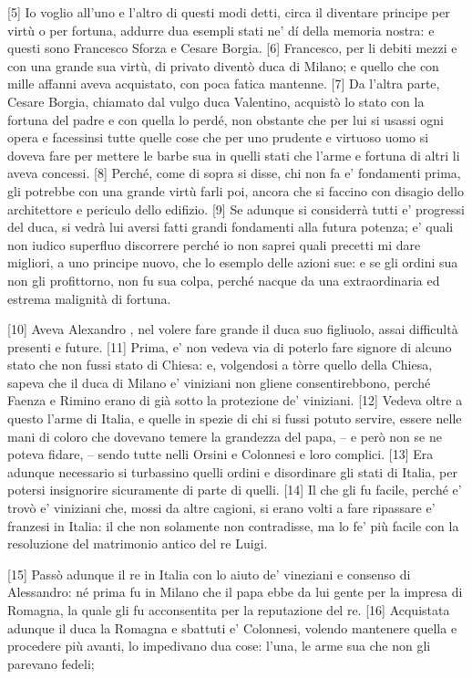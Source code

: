 {[}5{]} Io voglio all'uno e l'altro di questi modi detti, circa il
diventare principe per virtù o per fortuna, addurre dua esempli stati
ne' dí della memoria nostra: e questi sono Francesco Sforza e Cesare
Borgia. {[}6{]} Francesco, per li debiti mezzi e con una grande sua
virtù, di privato diventò duca di Milano; e quello che con mille affanni
aveva acquistato, con poca fatica mantenne. {[}7{]} Da l'altra parte,
Cesare Borgia, chiamato dal vulgo duca Valentino, acquistò lo stato con
la fortuna del padre e con quella lo perdé, non obstante che per lui si
usassi ogni opera e facessinsi tutte quelle cose che per uno prudente e
virtuoso uomo si doveva fare per mettere le barbe sua in quelli stati
che l'arme e fortuna di altri li aveva concessi. {[}8{]} Perché, come di
sopra si disse, chi non fa e' fondamenti prima, gli potrebbe con una
grande virtù farli poi, ancora che si faccino con disagio dello
architettore e periculo dello edifizio. {[}9{]} Se adunque si considerrà
tutti e' progressi del duca, si vedrà lui aversi fatti grandi fondamenti
alla futura potenza; e' quali non iudico superfluo discorrere perché io
non saprei quali precetti mi dare migliori, a uno principe nuovo, che lo
esemplo delle azioni sue: e se gli ordini sua non gli profittorno, non
fu sua colpa, perché nacque da una extraordinaria ed estrema malignità
di fortuna.

\quebra

{[}10{]} Aveva Alexandro , nel volere fare grande il duca suo
figliuolo, assai difficultà presenti e future. {[}11{]} Prima, e' non
vedeva via di poterlo fare signore di alcuno stato che non fussi stato
di Chiesa: e, volgendosi a tòrre quello della Chiesa, sapeva che il duca
di Milano e' viniziani non gliene consentirebbono, perché Faenza e
Rimino erano di già sotto la protezione de' viniziani. {[}12{]} Vedeva
oltre a questo l'arme di Italia, e quelle in spezie di chi si fussi
potuto servire, essere nelle mani di coloro che dovevano temere la
grandezza del papa, -- e però non se ne poteva fidare, -- sendo tutte
nelli Orsini e Colonnesi e loro complici. {[}13{]} Era adunque
necessario si turbassino quelli ordini e disordinare gli stati di
Italia, per potersi insignorire sicuramente di parte di quelli. {[}14{]}
Il che gli fu facile, perché e' trovò e' viniziani che, mossi da altre
cagioni, si erano volti a fare ripassare e' franzesi in Italia: il che
non solamente non contradisse, ma lo fe' più facile con la resoluzione
del matrimonio antico del re Luigi.

{[}15{]} Passò adunque il re in Italia con lo aiuto de' vineziani e
consenso di Alessandro: né prima fu in Milano che il papa ebbe da lui
gente per la impresa di Romagna, la quale gli fu acconsentita per la
reputazione del re. {[}16{]} Acquistata adunque il duca la Romagna e
sbattuti e' Colonnesi, volendo mantenere quella e procedere più avanti,
lo impedivano dua cose: l'una, le arme sua che non gli parevano fedeli; \linebreak


